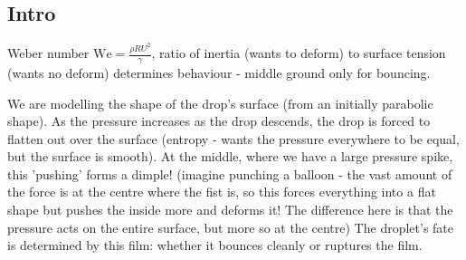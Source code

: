 \documentclass[11pt,a4paper]{article}
\begin{document}
	
	\subsection{Intro}
	Weber number $\text{We} = \frac{\rho RU^2}{\gamma}$, ratio of inertia (wants to deform) to surface tension (wants no deform) determines behaviour - middle ground only for bouncing.
	
	We are modelling the shape of the drop's surface (from an initially parabolic shape). As the pressure increases as the drop descends, the drop is forced to flatten out over the surface (entropy - wants the pressure everywhere to be equal, but the surface is smooth). At the middle, where we have a large pressure spike, this 'pushing' forms a dimple! (imagine punching a balloon - the vast amount of the force is at the centre where the fist is, so this forces everything into a flat shape but pushes the inside more and deforms it! The difference here is that the pressure acts on the entire surface, but more so at the centre)
	The droplet's fate is determined by this film: whether it bounces cleanly or ruptures the film.
	
	
	
	
\end{document}
